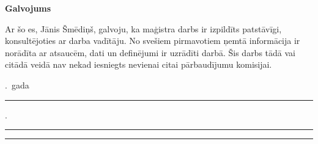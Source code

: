 \begin{center}
	\Large\bfseries Galvojums
\end{center}

Ar šo es, Jānis Šmēdiņš, galvoju, ka maģistra darbs ir izpildīts patstāvīgi,
konsultējoties ar darba vadītāju. No svešiem pirmavotiem ņemtā informācija
ir norādīta ar atsaucēm, dati un definējumi ir uzrādīti darbā.
Šis darbs tādā vai citādā veidā nav nekad iesniegts nevienai
citai pārbaudījumu komisijai.

\vspace{3cm}
\noindent
\begin{minipage}{\textwidth}
	\raggedright
	\the\year{}.~gada \rule[-2pt]{2em}{0.3pt}.~\rule[-2pt]{10em}{0.3pt}
	\hfill
	\rule[-2pt]{10em}{0.3pt}\\[-1ex]
	\hfill{}
\end{minipage}
